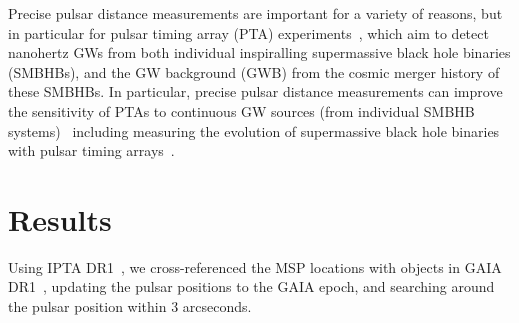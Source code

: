 \documentclass[iop,apj]{emulateapj}
\begin{document}
Precise pulsar distance measurements are important for a variety of reasons, but in particular for pulsar timing array (PTA) experiments~\cite{abb+17}, which aim to detect nanohertz GWs from both individual inspiralling supermassive black hole binaries (SMBHBs), and the GW background (GWB) from the cosmic merger history of these SMBHBs. In particular, precise pulsar distance measurements can improve the sensitivity of PTAs to continuous GW sources (from individual SMBHB systems)~\citep{zwx+16}  including measuring the evolution of supermassive black hole binaries with pulsar timing arrays~\cite{mgs+12}.

\section{Results}
Using IPTA DR1~\citep{v+16}, we cross-referenced the MSP locations with objects in GAIA DR1~\citep{gaiaDR1}, updating the pulsar positions to the GAIA epoch, and searching around the pulsar position within 3 arcseconds. 
\end{document}
